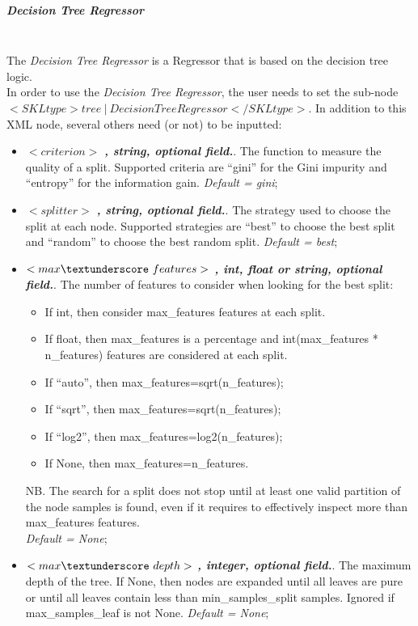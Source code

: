 \subparagraph{Decision Tree Regressor}
\mbox{}
\\The \textit{Decision Tree Regressor} is a Regressor that is based on the decision tree logic.
\\In order to use the \textit{Decision Tree Regressor}, the user needs to set the sub-node $<SKLtype>tree~\vert~DecisionTreeRegressor</SKLtype>$. In addition to this XML node, several others need (or not) to be inputted:
\begin{itemize}
\item $<criterion>$ \textbf{\textit{, string, optional field.}}.  The function to measure the quality of a split. Supported criteria are ``gini'' for the Gini impurity and ``entropy'' for the information gain. \textit{Default = gini};
\item $<splitter>$ \textbf{\textit{, string, optional field.}}. The strategy used to choose the split at each node. Supported strategies are ``best'' to choose the best split and ``random'' to choose the best random split. \textit{Default = best};
\item $<max\textunderscore~features>$ \textbf{\textit{, int, float or string, optional field.}}. The number of features to consider when looking for the best split:
\begin{itemize}
\item If int, then consider max\_features features at each split.
\item If float, then max\_features  is a percentage and int(max\_features * n\_features) features are considered at each split.
\item If “auto”, then max\_features=sqrt(n\_features);
\item If “sqrt”, then max\_features=sqrt(n\_features);
\item If “log2”, then max\_features=log2(n\_features);
\item If None, then max\_features=n\_features.
\end{itemize}
NB. The search for a split does not stop until at least one valid partition of the node samples is found, even if it requires to effectively inspect more than max\_features features. 
\\\textit{Default = None};
\item $<max\textunderscore~depth>$ \textbf{\textit{, integer, optional field.}}. The maximum depth of the tree. If None, then nodes are expanded until all leaves are pure or until all leaves contain less than min\_samples\_split samples. Ignored if max\_samples\_leaf is not None. \textit{Default = None};

\end{itemize}
